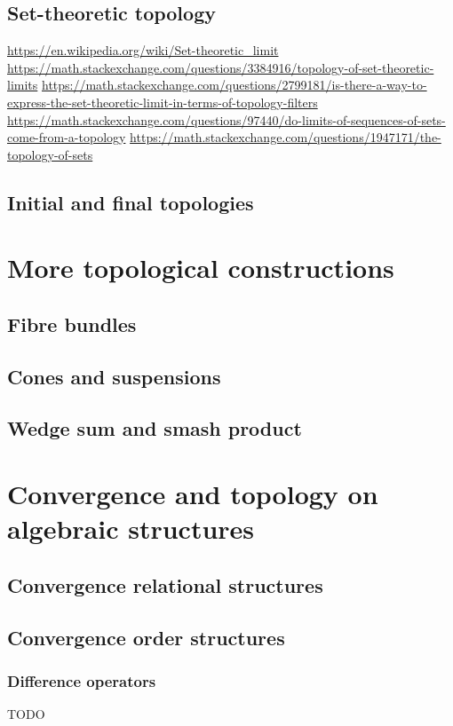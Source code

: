 \section{Set-theoretic topology}
\url{https://en.wikipedia.org/wiki/Set-theoretic_limit}
\url{https://math.stackexchange.com/questions/3384916/topology-of-set-theoretic-limits}
\url{https://math.stackexchange.com/questions/2799181/is-there-a-way-to-express-the-set-theoretic-limit-in-terms-of-topology-filters}
\url{https://math.stackexchange.com/questions/97440/do-limits-of-sequences-of-sets-come-from-a-topology}
\url{https://math.stackexchange.com/questions/1947171/the-topology-of-sets}

\section{Initial and final topologies}

\chapter{More topological constructions}
\section{Fibre bundles}
\section{Cones and suspensions}
\section{Wedge sum and smash product}

\chapter{Convergence and topology on algebraic structures}
\section{Convergence relational structures}
\section{Convergence order structures}
\subsection{Difference operators}
TODO